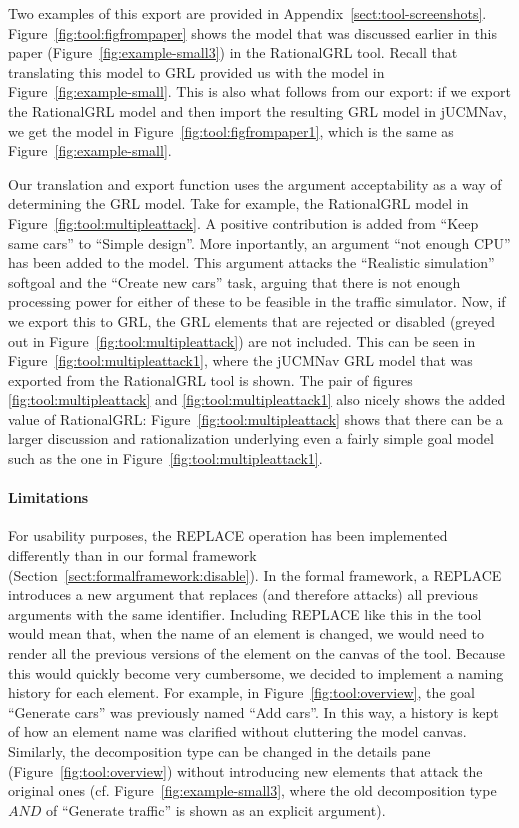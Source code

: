 Two examples of this export are provided in Appendix~\ref{sect:tool-screenshots}. Figure~\ref{fig:tool:figfrompaper} shows the model that was discussed earlier in this paper (Figure~\ref{fig:example-small3}) in the RationalGRL tool. Recall that translating this model to GRL provided us with the model in Figure~\ref{fig:example-small}. This is also what follows from our export: if we export the RationalGRL model and then import the resulting GRL model in jUCMNav, we get the model in Figure~\ref{fig:tool:figfrompaper1}, which is the same as Figure~\ref{fig:example-small}.

Our translation and export function uses the argument acceptability as a way of determining the GRL model. Take for example, the RationalGRL model in Figure~\ref{fig:tool:multipleattack}. A positive contribution is added from ``Keep same cars'' to ``Simple design''. More inportantly, an argument ``not enough CPU'' has been added to the model. This argument attacks the ``Realistic simulation'' softgoal and the ``Create new cars'' task, arguing that there is not enough processing power for either of these to be feasible in the traffic simulator. Now, if we export this to GRL, the GRL elements that are rejected or disabled (greyed out in Figure~\ref{fig:tool:multipleattack}) are not included. This can be seen in Figure~\ref{fig:tool:multipleattack1}, where the jUCMNav GRL model that was exported from the RationalGRL tool is shown. The pair of figures \ref{fig:tool:multipleattack} and \ref{fig:tool:multipleattack1} also nicely shows the added value of RationalGRL: Figure~\ref{fig:tool:multipleattack} shows that there can be a larger discussion and rationalization underlying even a fairly simple goal model such as the one in Figure~\ref{fig:tool:multipleattack1}. 

\paragraph{Limitations}
For usability purposes, the \textsf{REPLACE} operation has been implemented differently than in our formal framework (Section~\ref{sect:formalframework:disable}). In the formal framework, a \textsf{REPLACE} introduces a new argument that replaces (and therefore attacks) all previous arguments with the same identifier. Including \textsf{REPLACE} like this in the tool would mean that, when the name of an element is changed, we would need to render all the previous versions of the element on the canvas of the tool. Because this would quickly become very cumbersome, we decided to implement a naming history for each element. For example, in Figure~\ref{fig:tool:overview}, the goal ``Generate cars'' was previously named ``Add cars''. In this way, a history is kept of how an element name was clarified without cluttering the model canvas. Similarly, the decomposition type can be changed in the details pane (Figure~\ref{fig:tool:overview}) without introducing new elements that attack the original ones (cf. Figure~\ref{fig:example-small3}, where the old decomposition type $AND$ of ``Generate traffic'' is shown as an explicit argument).  